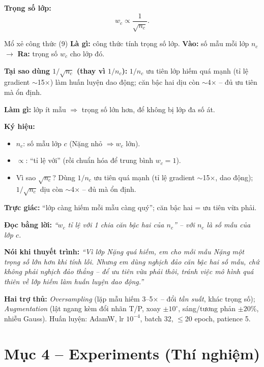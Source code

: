 \documentclass[12pt,a4paper]{article}
\begin{document}
\textbf{Trọng số lớp:}
\begin{equation}
w_c \propto \frac{1}{\sqrt{n_c}}.
\label{eq:weight}
\end{equation}
\begin{ctbox}{Mổ xẻ công thức (9)}
\textbf{Là gì:} công thức tính trọng số lớp. \quad\textbf{Vào:} số mẫu mỗi lớp $n_c$ $\to$ \textbf{Ra:} trọng số $w_c$ cho lớp đó.

\textbf{Tại sao dùng $1/\sqrt{n_c}$ (thay vì $1/n_c$):} $1/n_c$ ưu tiên lớp hiếm quá mạnh (tỉ lệ gradient $\sim$15$\times$) làm huấn luyện dao động; căn bậc hai dịu còn $\sim$4$\times$ -- đủ ưu tiên mà ổn định.

\textbf{Làm gì:} lớp ít mẫu $\Rightarrow$ trọng số lớn hơn, để không bị lớp đa số át.

\textbf{Ký hiệu:}
\begin{itemize}[leftmargin=1.4em,itemsep=1pt]
\item $n_c$: số mẫu lớp $c$ (Nặng nhỏ $\Rightarrow w_c$ lớn).
\item $\propto$: ``tỉ lệ với'' (rồi chuẩn hóa để trung bình $w_c=1$).
\item Vì sao $\sqrt{n_c}$? Dùng $1/n_c$ ưu tiên quá mạnh (tỉ lệ gradient $\sim$15$\times$, dao động); $1/\sqrt{n_c}$ dịu còn $\sim$4$\times$ -- đủ mà ổn định.
\end{itemize}
\textbf{Trực giác:} ``lớp càng hiếm mỗi mẫu càng quý''; căn bậc hai = ưu tiên vừa phải.

\textbf{Đọc bằng lời:} \emph{``$w_c$ tỉ lệ với 1 chia căn bậc hai của $n_c$'' -- với $n_c$ là số mẫu của lớp $c$.}

\textbf{Nói khi thuyết trình:} \emph{``Vì lớp Nặng quá hiếm, em cho mỗi mẫu Nặng một trọng số lớn hơn khi tính lỗi. Nhưng em dùng nghịch đảo căn bậc hai số mẫu, chứ không phải nghịch đảo thẳng -- để ưu tiên vừa phải thôi, tránh việc mô hình quá thiên về lớp hiếm làm huấn luyện dao động.''}
\end{ctbox}

\textbf{Hai trợ thủ:} \emph{Oversampling} (lặp mẫu hiếm 3--5$\times$ -- đổi \emph{tần suất}, khác trọng số); \emph{Augmentation} (lật ngang kèm đổi nhãn T/P, xoay $\pm10^\circ$, sáng/tương phản $\pm20\%$, nhiễu Gauss). Huấn luyện: AdamW, lr $10^{-4}$, batch 32, $\le$20 epoch, patience 5.

\section{Mục 4 -- Experiments (Thí nghiệm)}
\end{document}
